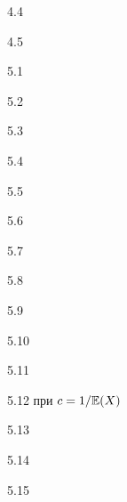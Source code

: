 \protect \hypertarget {soln:4.4}{}
\begin{solution}{{4.4}}
\end{solution}
\protect \hypertarget {soln:4.5}{}
\begin{solution}{{4.5}}
\end{solution}
\protect \hypertarget {soln:5.1}{}
\begin{solution}{{5.1}}
\end{solution}
\protect \hypertarget {soln:5.2}{}
\begin{solution}{{5.2}}
\end{solution}
\protect \hypertarget {soln:5.3}{}
\begin{solution}{{5.3}}
\end{solution}
\protect \hypertarget {soln:5.4}{}
\begin{solution}{{5.4}}
\end{solution}
\protect \hypertarget {soln:5.5}{}
\begin{solution}{{5.5}}
\end{solution}
\protect \hypertarget {soln:5.6}{}
\begin{solution}{{5.6}}
\end{solution}
\protect \hypertarget {soln:5.7}{}
\begin{solution}{{5.7}}
\end{solution}
\protect \hypertarget {soln:5.8}{}
\begin{solution}{{5.8}}
\end{solution}
\protect \hypertarget {soln:5.9}{}
\begin{solution}{{5.9}}
\end{solution}
\protect \hypertarget {soln:5.10}{}
\begin{solution}{{5.10}}
\end{solution}
\protect \hypertarget {soln:5.11}{}
\begin{solution}{{5.11}}
\end{solution}
\protect \hypertarget {soln:5.12}{}
\begin{solution}{{5.12}}
при $c=1/\mathbb{E}(X)$
\end{solution}
\protect \hypertarget {soln:5.13}{}
\begin{solution}{{5.13}}
\end{solution}
\protect \hypertarget {soln:5.14}{}
\begin{solution}{{5.14}}
\end{solution}
\protect \hypertarget {soln:5.15}{}
\begin{solution}{{5.15}}
\end{solution}
